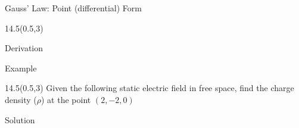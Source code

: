 \begin{frame}{Gauss' Law: Point (differential) Form}
\begin{textblock}{14.5}(0.5,3)

	\begin{myblock}[0.9]{Derivation}
	\vspace{-0.5in}

\end{myblock}

\end{textblock}
\end{frame}



\begin{frame}{Example}
\begin{textblock}{14.5}(0.5,3)
Given the following static electric field in free space, find the charge density ($\rho$) at the point $(2,-2,0)$

\vspace{-16pt}
\begin{small}
\end{small}

	\vspace{-24pt}
	\begin{myblock}[0.9]{Solution}
	\vspace{-18pt}
	\begin{small}
		\alert{
		\vspace{-18pt}
		}
	\end{small}
	\end{myblock}

\end{textblock}
\end{frame}

